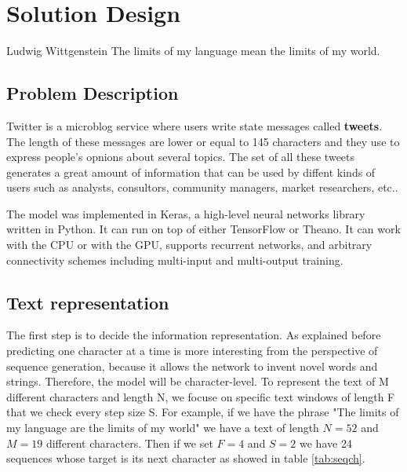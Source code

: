 \chapter{Solution Design}
\label{ch:design}

\begin{chapterquote}{Ludwig Wittgenstein}
	The limits of my language mean the limits of my world.
\end{chapterquote}

\section{Problem Description}

Twitter is a microblog service where users write state messages called \textbf{tweets}. The length of these messages are lower or equal to 145 characters and they use to express people's opnions about several topics. The set of all these tweets generates a great amount of information that can be used by diffent kinds of users such as analysts, consultors, community managers, market researchers, etc..

The model was implemented in Keras, a high-level neural networks library written in Python. It can run on top of either TensorFlow or Theano. It can work with the CPU or with the GPU, supports recurrent networks, and arbitrary connectivity schemes including multi-input and multi-output training. 
\section{Text representation}

The first step is to decide the information representation. As explained before predicting one character at a time is more interesting from the perspective of sequence generation, because it allows the network to invent novel words and strings. Therefore, the model will be character-level. To represent the text of M different characters and length N, we focuse on specific text windows of length F that we check every step size S. For example, if we have the phrase "The limits of my language are the limits of my world" we have a text of length $N=52$ and $M=19$ different characters. Then if we set $F=4$ and $S=2$ we have 24 sequences whose target is its next character as showed in table \ref{tab:seqch}.

